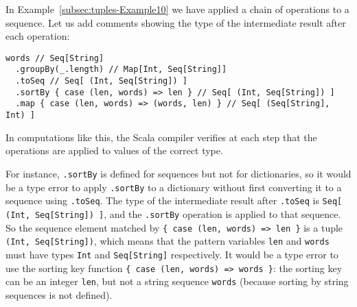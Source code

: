 In Example~\ref{subsec:tuples-Example10} we have applied a chain
of operations to a sequence. Let us add comments showing the type
of the intermediate result after each operation:
\begin{lstlisting}
words // Seq[String]
  .groupBy(_.length) // Map[Int, Seq[String]]
  .toSeq // Seq[ (Int, Seq[String]) ]
  .sortBy { case (len, words) => len } // Seq[ (Int, Seq[String]) ]
  .map { case (len, words) => (words, len) } // Seq[ (Seq[String], Int) ]
\end{lstlisting}
In computations like this, the Scala compiler verifies at each step
that the operations are applied to values of the correct type.

For instance, \lstinline!.sortBy!
is defined for sequences but not for dictionaries, so it would be
a type error to apply \lstinline!.sortBy!
to a dictionary without first converting it to a sequence using \lstinline!.toSeq!.
The type of the intermediate result after \lstinline!.toSeq!
is \lstinline!Seq[ (Int, Seq[String]) ]!,
and the \lstinline!.sortBy!
operation is applied to that sequence. So the sequence element matched
by \lstinline!{ case (len, words) => len }!
is a tuple \lstinline!(Int, Seq[String])!,
which means that the pattern variables \lstinline!len!
and \lstinline!words! must
have types \lstinline!Int!
and \lstinline!Seq[String]!
respectively. It would be a type error to use the sorting key function
\lstinline!{ case (len, words) => words }!:
the sorting key can be an integer \lstinline!len!,
but not a string sequence \lstinline!words!
(because sorting by string sequences is not defined).

